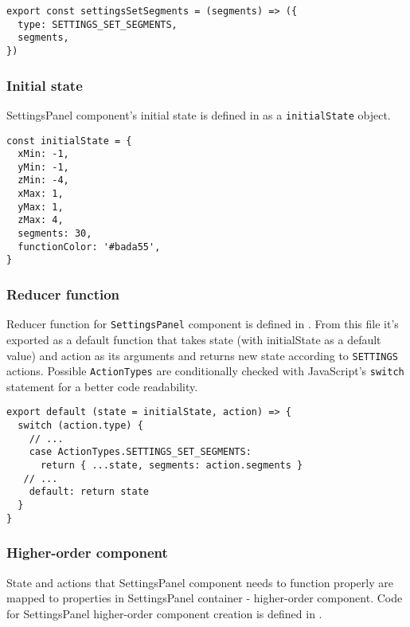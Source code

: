 \begin{lstlisting}[caption={Action for setting fnction segments.},captionpos=b]
export const settingsSetSegments = (segments) => ({
  type: SETTINGS_SET_SEGMENTS,
  segments,
})
\end{lstlisting}

\subsubsection{Initial state}
SettingsPanel component's initial state is defined in  as a \texttt{initialState} object.

\begin{lstlisting}[caption={Initial state of a \textsl{calculator}.},captionpos=b]
const initialState = {
  xMin: -1,
  yMin: -1,
  zMin: -4,
  xMax: 1,
  yMax: 1,
  zMax: 4,
  segments: 30,
  functionColor: '#bada55',
}
\end{lstlisting}

\subsubsection{Reducer function}
Reducer function for \texttt{SettingsPanel} component is defined in . From this file it's exported as a default function that takes state (with initialState as a default value) and action as its arguments and returns new state according to \texttt{SETTINGS} actions. Possible \texttt{ActionTypes} are conditionally checked with JavaScript's \texttt{switch} statement for a better code readability.

\begin{lstlisting}[caption={Update of \texttt{state.settings.segments} value.},captionpos=b]
export default (state = initialState, action) => {
  switch (action.type) {
    // ...
    case ActionTypes.SETTINGS_SET_SEGMENTS:
      return { ...state, segments: action.segments }
   // ...
    default: return state
  }
}
\end{lstlisting}

\subsubsection{Higher-order component}
State and actions that SettingsPanel component needs to function properly are mapped to properties in SettingsPanel container - higher-order component. Code for SettingsPanel higher-order component creation is defined in .

